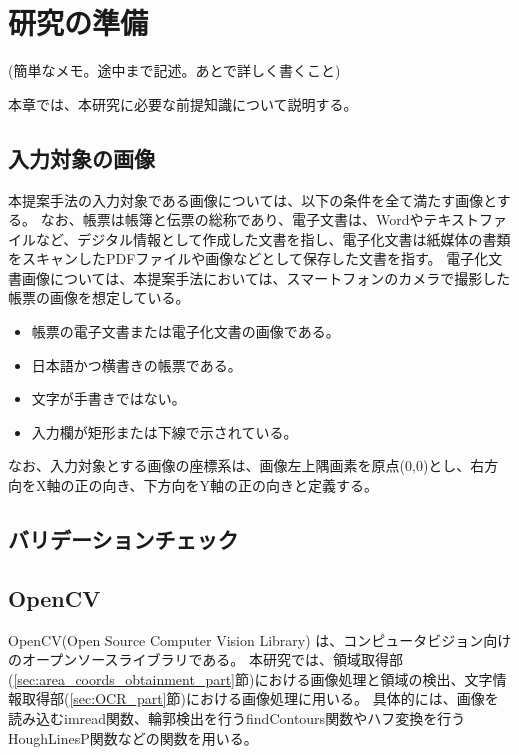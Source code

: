 \chapter{研究の準備}\label{cha:Preparation}
(簡単なメモ。途中まで記述。あとで詳しく書くこと)

本章では、本研究に必要な前提知識について説明する。


\section{入力対象の画像}\label{sec:input_images}
本提案手法の入力対象である画像については、以下の条件を全て満たす画像とする。
なお、帳票は帳簿と伝票の総称であり\cite{帳票}、電子文書は、Wordやテキストファイルなど、デジタル情報として作成した文書を指し、電子化文書は紙媒体の書類をスキャンしたPDFファイルや画像などとして保存した文書を指す\cite{電子文書と電子化文書}。
電子化文書画像については、本提案手法においては、スマートフォンのカメラで撮影した帳票の画像を想定している。

\begin{itemize}
  \item 帳票の電子文書または電子化文書の画像である。
  \item 日本語かつ横書きの帳票である。
  \item 文字が手書きではない。
  \item 入力欄が矩形または下線で示されている。
\end{itemize}

なお、入力対象とする画像の座標系は、画像左上隅画素を原点(0,0)とし、右方向をX軸の正の向き、下方向をY軸の正の向きと定義する。

\section{バリデーションチェック}\label{sec:validation_check}


\section{OpenCV}\label{sec:OpenCV}
OpenCV(Open Source Computer Vision Library) は、コンピュータビジョン向けのオープンソースライブラリである\cite{OpenCV}。
本研究では、領域取得部(\ref{sec:area_coords_obtainment_part}節)における画像処理と領域の検出、文字情報取得部(\ref{sec:OCR_part}節)における画像処理に用いる。
具体的には、画像を読み込むimread関数、輪郭検出を行うfindContours関数やハフ変換を行うHoughLinesP関数などの関数を用いる。

